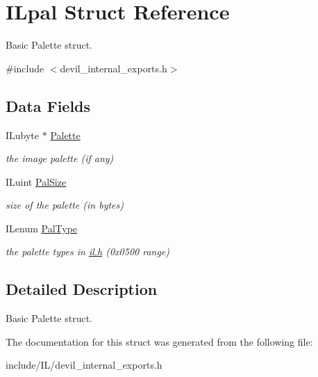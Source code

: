\hypertarget{struct_i_lpal}{\section{I\+Lpal Struct Reference}
\label{struct_i_lpal}
}


Basic Palette struct.  




{\ttfamily \#include $<$devil\+\_\+internal\+\_\+exports.\+h$>$}

\subsection*{Data Fields}
\begin{DoxyCompactItemize}
\item 
\hypertarget{struct_i_lpal_ab520cff305ed9ee13d2eac7a87ac1d92}{I\+Lubyte $\ast$ \hyperlink{struct_i_lpal_ab520cff305ed9ee13d2eac7a87ac1d92}{Palette}}\label{struct_i_lpal_ab520cff305ed9ee13d2eac7a87ac1d92}

\begin{DoxyCompactList}\small\item\em the image palette (if any) \end{DoxyCompactList}\item 
\hypertarget{struct_i_lpal_a728a63d4c8b857a800a4d19e250a8c4b}{I\+Luint \hyperlink{struct_i_lpal_a728a63d4c8b857a800a4d19e250a8c4b}{Pal\+Size}}\label{struct_i_lpal_a728a63d4c8b857a800a4d19e250a8c4b}

\begin{DoxyCompactList}\small\item\em size of the palette (in bytes) \end{DoxyCompactList}\item 
\hypertarget{struct_i_lpal_ab091aab8d79003031a4e9957e85f43ca}{I\+Lenum \hyperlink{struct_i_lpal_ab091aab8d79003031a4e9957e85f43ca}{Pal\+Type}}\label{struct_i_lpal_ab091aab8d79003031a4e9957e85f43ca}

\begin{DoxyCompactList}\small\item\em the palette types in \hyperlink{il_8h}{il.\+h} (0x0500 range) \end{DoxyCompactList}\end{DoxyCompactItemize}


\subsection{Detailed Description}
Basic Palette struct. 

The documentation for this struct was generated from the following file\+:\begin{DoxyCompactItemize}
\item 
include/\+I\+L/devil\+\_\+internal\+\_\+exports.\+h\end{DoxyCompactItemize}
